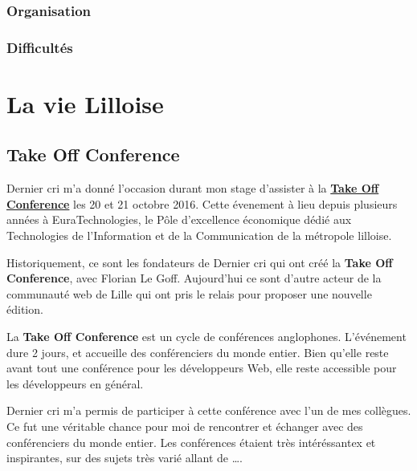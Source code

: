 \documentclass[12pt,a4paper]{article}
\begin{document}
  \subsubsection{Organisation}\label{organisation-1}

  \subsubsection{Difficultés}\label{difficultuxe9s-1}

  \section{La vie Lilloise}\label{la-vie-lilloise}

  \subsection{Take Off Conference}\label{take-off-conference}

  \bigskip

  Dernier cri m'a donné l'occasion durant mon stage d'assister à la
  \href{http://takeoffconf.com/2016}{\textbf{Take Off Conference}} les 20
  et 21 octobre 2016. Cette évenement à lieu depuis plusieurs années à
  EuraTechnologies, le Pôle d'excellence économique dédié aux Technologies
  de l'Information et de la Communication de la métropole lilloise.

  \bigskip

  Historiquement, ce sont les fondateurs de Dernier cri qui ont créé la
  \textbf{Take Off Conference}, avec Florian Le Goff. Aujourd'hui ce sont
  d'autre acteur de la communauté web de Lille qui ont pris le relais pour
  proposer une nouvelle édition.

  \bigskip

  La \textbf{Take Off Conference} est un cycle de conférences anglophones.
  L'événement dure 2 jours, et accueille des conférenciers du monde
  entier. Bien qu'elle reste avant tout une conférence pour les
  développeurs Web, elle reste accessible pour les développeurs en
  général.

  \bigskip

  Dernier cri m'a permis de participer à cette conférence avec l'un de mes
  collègues. Ce fut une véritable chance pour moi de rencontrer et
  échanger avec des conférenciers du monde entier. Les conférences étaient
  très intéréssantex et inspirantes, sur des sujets très varié allant de
  \ldots{}.

  \bigskip
\end{document}
